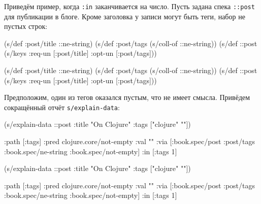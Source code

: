 Приведём пример, когда \verb|:in| заканчивается на число. Пусть задана
спека \verb|::post| для публикации в блоге. Кроме заголовка у записи могут
быть теги, набор не пустых строк:

\ifx\devicetype\mobile

\begin{english}
  \begin{clojure}
(s/def :post/title ::ne-string)
(s/def :post/tags
  (s/coll-of ::ne-string))
(s/def ::post
  (s/keys :req-un [:post/title]
          :opt-un [:post/tags]))
  \end{clojure}
\end{english}

\else

\begin{english}
  \begin{clojure}
(s/def :post/title ::ne-string)
(s/def :post/tags (s/coll-of ::ne-string))
(s/def ::post (s/keys :req-un [:post/title]
                      :opt-un [:post/tags]))
  \end{clojure}
\end{english}

\fi

Предположим, один из тегов оказался пустым, что не имеет смысла. Привёдем
сокращённый отчёт \verb|s/explain-data|:

\ifx\devicetype\mobile

\begin{english}
  \begin{clojure}
(s/explain-data ::post
  {:title "On Clojure"
   :tags ["clojure" ""]})

{:path [:tags]
 :pred clojure.core/not-empty
 :val ""
 :via [:book.spec/post
       :post/tags
       :book.spec/ne-string
       :book.spec/not-empty]
 :in [:tags 1]}
  \end{clojure}
\end{english}

\else

\begin{english}
  \begin{clojure}
(s/explain-data ::post {:title "On Clojure"
                        :tags ["clojure" ""]})

{:path [:tags]
 :pred clojure.core/not-empty
 :val ""
 :via [:book.spec/post
       :post/tags
       :book.spec/ne-string
       :book.spec/not-empty]
 :in [:tags 1]}
  \end{clojure}
\end{english}

